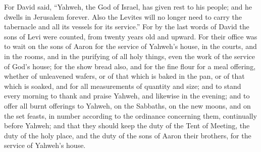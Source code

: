 {For David said, “Yahweh, the God of Israel, has given rest to his people; and he dwells in Jerusalem forever.
Also the Levites will no longer need to carry the tabernacle and all its vessels for its service.”
For by the last words of David the sons of Levi were counted, from twenty years old and upward.
For their office was to wait on the sons of Aaron for the service of Yahweh’s house, in the courts, and in the rooms, and in the purifying of all holy things, even the work of the service of God’s house;
for the show bread also, and for the fine flour for a meal offering, whether of unleavened wafers, or of that which is baked in the pan, or of that which is soaked, and for all measurements of quantity and size;
and to stand every morning to thank and praise Yahweh, and likewise in the evening;
and to offer all burnt offerings to Yahweh, on the Sabbaths, on the new moons, and on the set feasts, in number according to the ordinance concerning them, continually before Yahweh;
and that they should keep the duty of the Tent of Meeting, the duty of the holy place, and the duty of the sons of Aaron their brothers, for the service of Yahweh’s house.

}
